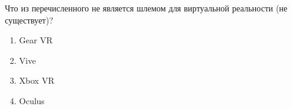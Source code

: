 
Что из перечисленного не является шлемом для виртуальной реальности (не существует)?

\begin{enumerate}
    \item Gear VR
    \item Vive
    \item Xbox VR
    \item Oculus
\end{enumerate}